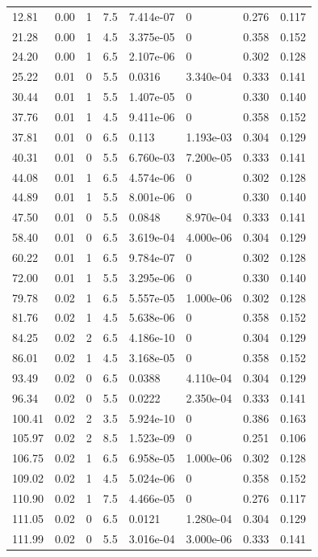 \documentclass[preview]{standalone}
\begin{document}
{{\begin{tabular}{L{1.2cm}C{1.2cm} C{0.3cm}C{0.5cm} C{1.4cm}C{1.4cm} C{1.4cm}C{1.4cm}}
  12.81  &  0.00  & 1     & 7.5 &  7.414e-07  & 0  & 0.276 &  0.117   \\ 
  21.28  &  0.00  & 1     & 4.5 &  3.375e-05  & 0  & 0.358 &  0.152   \\ 
  24.20  &  0.00  & 1     & 6.5 &  2.107e-06  & 0  & 0.302 &  0.128   \\ 
  25.22  &  0.01  & 0     & 5.5 &  0.0316  & 3.340e-04  & 0.333 &  0.141   \\ 
  30.44  &  0.01  & 1     & 5.5 &  1.407e-05  & 0  & 0.330 &  0.140   \\ 
  37.76  &  0.01  & 1     & 4.5 &  9.411e-06  & 0  & 0.358 &  0.152   \\ 
  37.81  &  0.01  & 0     & 6.5 &  0.113  & 1.193e-03  & 0.304 &  0.129   \\ 
  40.31  &  0.01  & 0     & 5.5 &  6.760e-03  & 7.200e-05  & 0.333 &  0.141   \\ 
  44.08  &  0.01  & 1     & 6.5 &  4.574e-06  & 0  & 0.302 &  0.128   \\ 
  44.89  &  0.01  & 1     & 5.5 &  8.001e-06  & 0  & 0.330 &  0.140   \\ 
  47.50  &  0.01  & 0     & 5.5 &  0.0848  & 8.970e-04  & 0.333 &  0.141   \\ 
  58.40  &  0.01  & 0     & 6.5 &  3.619e-04  & 4.000e-06  & 0.304 &  0.129   \\ 
  60.22  &  0.01  & 1     & 6.5 &  9.784e-07  & 0  & 0.302 &  0.128   \\ 
  72.00  &  0.01  & 1     & 5.5 &  3.295e-06  & 0  & 0.330 &  0.140   \\ 
  79.78  &  0.02  & 1     & 6.5 &  5.557e-05  & 1.000e-06  & 0.302 &  0.128   \\ 
  81.76  &  0.02  & 1     & 4.5 &  5.638e-06  & 0  & 0.358 &  0.152   \\ 
  84.25  &  0.02  & 2     & 6.5 &  4.186e-10  & 0  & 0.304 &  0.129   \\ 
  86.01  &  0.02  & 1     & 4.5 &  3.168e-05  & 0  & 0.358 &  0.152   \\ 
  93.49  &  0.02  & 0     & 6.5 &  0.0388  & 4.110e-04  & 0.304 &  0.129   \\ 
  96.34  &  0.02  & 0     & 5.5 &  0.0222  & 2.350e-04  & 0.333 &  0.141   \\ 
  100.41  &  0.02  & 2     & 3.5 &  5.924e-10  & 0  & 0.386 &  0.163   \\ 
  105.97  &  0.02  & 2     & 8.5 &  1.523e-09  & 0  & 0.251 &  0.106   \\ 
  106.75  &  0.02  & 1     & 6.5 &  6.958e-05  & 1.000e-06  & 0.302 &  0.128   \\ 
  109.02  &  0.02  & 1     & 4.5 &  5.024e-06  & 0  & 0.358 &  0.152   \\ 
  110.90  &  0.02  & 1     & 7.5 &  4.466e-05  & 0  & 0.276 &  0.117   \\ 
  111.05  &  0.02  & 0     & 6.5 &  0.0121  & 1.280e-04  & 0.304 &  0.129   \\ 
  111.99  &  0.02  & 0     & 5.5 &  3.016e-04  & 3.000e-06  & 0.333 &  0.141   \\ 
\hline 
\end{tabular} 

}}
\end{document}
